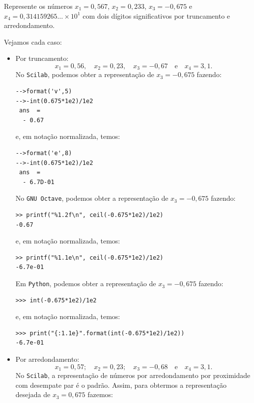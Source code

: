 \begin{ex} Represente os números $x_1 = 0,567$, $x_2 = 0,233$, $x_3 = -0,675$ e $x_4 = 0,314159265 \ldots \times 10^1$ com dois dígitos significativos por truncamento e arredondamento.
\end{ex}
\begin{sol} Vejamos cada caso:
  \begin{itemize}
  \item Por truncamento:
    \begin{equation}
      x_1=0,56,\quad x_2=0,23,\quad x_3=-0,67\quad\mbox{e}\quad x_4 = 3,1.
    \end{equation}
\ifisscilab
No \verb+Scilab+, podemos obter a representação de $x_3 = -0,675$ fazendo:
\begin{verbatim}
-->format('v',5)
-->-int(0.675*1e2)/1e2
 ans  =
  - 0.67
\end{verbatim}
e, em notação normalizada, temos:
\begin{verbatim}
-->format('e',8)
-->-int(0.675*1e2)/1e2
 ans  =
  - 6.7D-01
\end{verbatim}
\fi
\ifisoctave
No \verb+GNU Octave+, podemos obter a representação de $x_3 = -0,675$ fazendo:
\begin{verbatim}
>> printf("%1.2f\n", ceil(-0.675*1e2)/1e2)
-0.67
\end{verbatim}
e, em notação normalizada, temos:
\begin{verbatim}
>> printf("%1.1e\n", ceil(-0.675*1e2)/1e2)
-6.7e-01
\end{verbatim}
\fi
\ifispython
Em \verb+Python+, podemos obter a representação de $x_3 = -0,675$ fazendo:
\begin{verbatim}
>>> int(-0.675*1e2)/1e2
\end{verbatim}
e, em notação normalizada, temos:
\begin{verbatim}
>>> print("{:1.1e}".format(int(-0.675*1e2)/1e2))
-6.7e-01
\end{verbatim}
\fi
\item Por arredondamento:
\begin{equation}
   x_1=0,57;\quad x_2=0,23;\quad x_3=-0,68\quad\mbox{e}\quad x_4 = 3,1.
\end{equation}
\ifisscilab
No \verb+Scilab+, a representação de números por arredondamento por proximidade com desempate par é o padrão. Assim, para obtermos a representação desejada de $x_3 = 0,675$ fazemos:

\end{itemize}
\end{sol}
